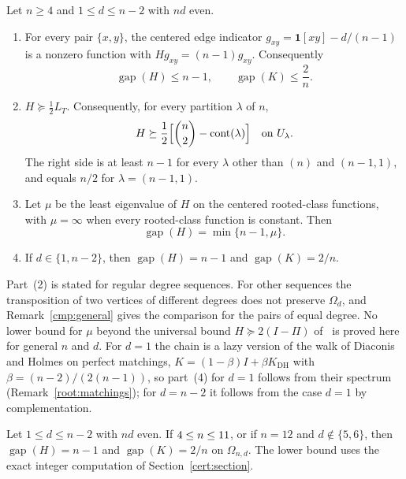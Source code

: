 \begin{theorem}\label{thm:main}
Let $n\ge4$ and $1\le d\le n-2$ with $nd$ even.
\begin{enumerate}
\item For every pair $\{x,y\}$, the centered edge indicator
$g_{xy}=\mathbf1[xy]-d/(n-1)$ is a nonzero function with $Hg_{xy}=(n-1)g_{xy}$.
Consequently
\begin{equation}\label{eq:upper}
 \operatorname{gap}(H)\le n-1,\qquad \operatorname{gap}(K)\le\frac2n .
\end{equation}
\item $H\succeq\tfrac12L_T$. Consequently, for every partition $\lambda$ of
$n$,
\begin{equation}\label{eq:sector}
 H\succeq\frac12\Bigl[\binom n2-\operatorname{cont}(\lambda)\Bigr]
 \quad\text{on }U_\lambda .
\end{equation}
The right side is at least $n-1$ for every $\lambda$ other than $(n)$ and
$(n-1,1)$, and equals $n/2$ for $\lambda=(n-1,1)$.
\item Let $\mu$ be the least eigenvalue of $H$ on the centered rooted-class
functions, with $\mu=\infty$ when every rooted-class function is constant.
Then
\begin{equation}\label{eq:reduction}
 \operatorname{gap}(H)=\min\{n-1,\mu\}.
\end{equation}
\item If $d\in\{1,n-2\}$, then $\operatorname{gap}(H)=n-1$ and
$\operatorname{gap}(K)=2/n$.
\end{enumerate}
\end{theorem}

Part~(2) is stated for regular degree sequences. For other sequences the
transposition of two vertices of different degrees does not preserve
$\Omega_d$, and Remark~\ref{cmp:general} gives the comparison for the pairs of
equal degree. No lower bound for $\mu$ beyond the universal bound
$H\succeq2(I-\Pi)$ of~\cite[Theorem~1.1 and Corollary~6.4]{S26} is proved
here for general $n$ and $d$. For $d=1$ the chain is a lazy version of the
walk of Diaconis and Holmes on perfect matchings,
$K=(1-\beta)I+\beta K_{\mathrm{DH}}$ with $\beta=(n-2)/(2(n-1))$, so
part~(4) for $d=1$ follows from their
spectrum~\cite[Theorem~2 and Corollary~1]{DH02}
(Remark~\ref{root:matchings}); for $d=n-2$ it follows from the case $d=1$ by
complementation.

\begin{theorem}\label{thm:small}
Let $1\le d\le n-2$ with $nd$ even. If $4\le n\le11$, or if $n=12$ and
$d\notin\{5,6\}$, then $\operatorname{gap}(H)=n-1$ and
$\operatorname{gap}(K)=2/n$ on $\Omega_{n,d}$. The lower bound
uses the exact integer computation of Section~\ref{cert:section}.
\end{theorem}

